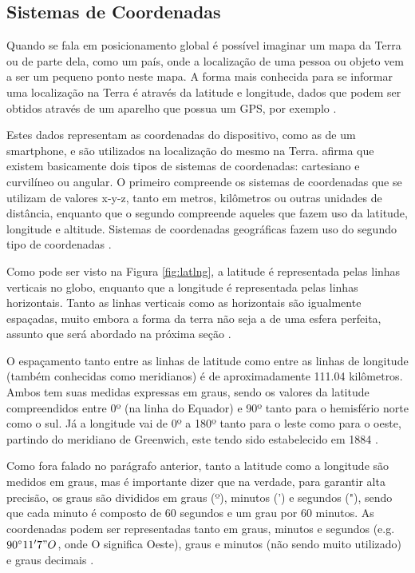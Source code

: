 \documentclass[diss]{template/setrem}
\begin{document}
\subsection{Sistemas de Coordenadas}
\label{subsec:sistemacoord}
Quando se fala em posicionamento global é possível imaginar um mapa da Terra ou de parte dela, como um país, onde a localização de uma pessoa ou objeto vem a ser um pequeno ponto neste mapa. A forma mais conhecida para se informar uma localização na Terra é através da latitude e longitude, dados que podem ser obtidos através de um aparelho que possua um GPS, por exemplo \citep{Holdener2011}.

Estes dados representam as coordenadas do dispositivo, como as de um smartphone, e são utilizados na localização do mesmo na Terra. \citet{Clynch2006} afirma que existem basicamente dois tipos de sistemas de coordenadas: cartesiano e curvilíneo ou angular. O primeiro compreende os sistemas de coordenadas que se utilizam de valores x-y-z, tanto em metros, kilômetros ou outras unidades de distância, enquanto que o segundo compreende aqueles que fazem uso da latitude, longitude e altitude. Sistemas de coordenadas geográficas fazem uso do segundo tipo de coordenadas \citep{Holdener2011}.

Como pode ser visto na Figura \ref{fig:latlng}, a latitude é representada pelas linhas verticais no globo, enquanto que a longitude é representada pelas linhas horizontais. Tanto as linhas verticais como as horizontais são igualmente espaçadas, muito embora a forma da terra não seja a de uma esfera perfeita, assunto que será abordado na próxima seção \citep{Holdener2011}.

O espaçamento tanto entre as linhas de latitude como entre as linhas de longitude (também conhecidas como meridianos) é de aproximadamente 111.04 kilômetros. Ambos tem suas medidas expressas em graus, sendo os valores da latitude compreendidos entre 0º (na linha do Equador) e 90º tanto para o hemisfério norte como o sul. Já a longitude vai de 0º a 180º tanto para o leste como para o oeste, partindo do meridiano de Greenwich, este tendo sido estabelecido em 1884 \citep{Holdener2011}.

Como fora falado no parágrafo anterior, tanto a latitude como a longitude são medidos em graus, mas é importante dizer que na verdade, para garantir alta precisão, os graus são divididos em graus (º), minutos (') e segundos ("), sendo que cada minuto é composto de 60 segundos e um grau por 60 minutos. As coordenadas podem ser representadas tanto em graus, minutos e segundos (e.g. $90^{\circ} 11' 7" O$, onde O significa Oeste), graus e minutos (não sendo muito utilizado) e graus decimais \citep{Holdener2011}.
\end{document}
